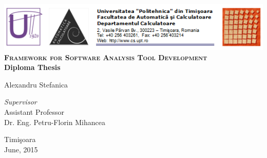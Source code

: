 \begin{titlepage}
	\begin{center}	
		\includegraphics[width=\textwidth]{img/header.png}\\[4cm]
		
		{\huge \bfseries \textsc{Framework for Software Analysis Tool Development}}
		\\[3cm]
		
		{\bfseries Diploma Thesis} \\[3cm]
						
				
		\begin{flushright}
				\large Alexandru Stefanica \\[1cm]
		\end{flushright}
		\begin{flushleft}
			 \large
				\emph{Supervisor} \\
				Assistant Professor \\
				Dr. Eng. Petru-Florin Mihancea \\[1cm]
		\end{flushleft}
		
		\vfill
		{\large {Timi\c{s}oara \\June, 2015}}
	\end{center}
\end{titlepage}
